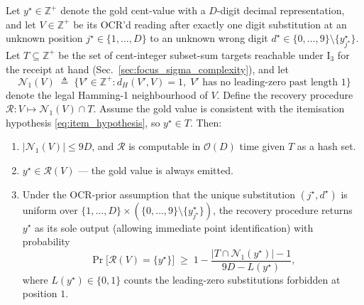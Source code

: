 \begin{proposition}
\label{prop:single_edit}
Let $y^\star \in \mathbb{Z}^+$ denote the gold cent-value with a
$D$-digit decimal representation, and let $V \in \mathbb{Z}^+$ be its
OCR'd reading after exactly one digit substitution at an unknown
position $j^\star \in \{1,\dots,D\}$ to an unknown wrong digit
$d^\star \in \{0,\dots,9\} \setminus \{y^\star_{j^\star}\}$.  Let
$T \subseteq \mathbb{Z}^+$ be the set of cent-integer subset-sum
targets reachable under $\mathrm{I}_3$ for the receipt at hand
(Sec.~\ref{sec:focus_sigma_complexity}), and let
\[
\mathcal{N}_1(V) \;\triangleq\; \{V'\in\mathbb{Z}^+ :
d_H(V',V)=1,\; V'\text{ has no leading-zero past length~1}\}
\]
denote the legal Hamming-1 neighbourhood of $V$.  Define the recovery
procedure $\mathcal{R}: V \mapsto \mathcal{N}_1(V) \cap T$.
Assume the gold value is consistent with the itemisation hypothesis
\eqref{eq:item_hypothesis}, so $y^\star \in T$.  Then:
\begin{enumerate}[label=(\roman*),leftmargin=1.4em]
\item $|\mathcal{N}_1(V)| \le 9D$, and $\mathcal{R}$ is computable in
$\mathcal{O}(D)$ time given $T$ as a hash set.
\item $y^\star \in \mathcal{R}(V)$ — the gold value is always emitted.
\item Under the OCR-prior assumption that the unique substitution
$(j^\star,d^\star)$ is uniform over $\{1,\dots,D\}\times
(\{0,\dots,9\}\setminus\{y^\star_{j^\star}\})$, the recovery procedure
returns $y^\star$ as its sole output (allowing immediate point
identification) with probability
\[
\Pr\bigl[\mathcal{R}(V)=\{y^\star\}\bigr] \;\geq\;
1 - \frac{|T \cap \mathcal{N}_1(y^\star)|-1}{9D - L(y^\star)},
\]
where $L(y^\star)\in\{0,1\}$ counts the leading-zero substitutions
forbidden at position $1$.
\end{enumerate}
\end{proposition}

